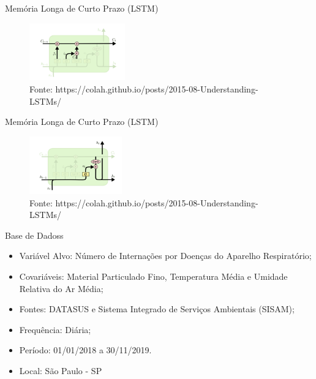\documentclass[
  ignorenonframetext,
]{beamer}
\providecommand{\tightlist}{%
  \setlength{\itemsep}{0pt}\setlength{\parskip}{0pt}}\usepackage{longtable,booktabs,array}
\begin{document}
\begin{frame}{Memória Longa de Curto Prazo (LSTM)}
\label{memuxf3ria-longa-de-curto-prazo-lstm-7}
\begin{figure}[H]

{\centering \includegraphics[width=1.62in,height=\textheight]{segunda_funcao_saida.png}

}

\caption{Fonte:
https://colah.github.io/posts/2015-08-Understanding-LSTMs/}

\end{figure}%
\end{frame}

\begin{frame}{Memória Longa de Curto Prazo (LSTM)}
\label{memuxf3ria-longa-de-curto-prazo-lstm-8}
\begin{figure}[H]

{\centering \includegraphics[width=1.57in,height=\textheight]{saida_final.png}

}

\caption{Fonte:
https://colah.github.io/posts/2015-08-Understanding-LSTMs/}

\end{figure}%
\end{frame}

\begin{frame}{Base de Dadoss}
\label{base-de-dadoss}
\begin{itemize}
\tightlist
\item
  Variável Alvo: Número de Internações por Doenças do Aparelho
  Respiratório;
\item
  Covariáveis: Material Particulado Fino, Temperatura Média e Umidade
  Relativa do Ar Média;
\item
  Fontes: DATASUS e Sistema Integrado de Serviços Ambientais (SISAM);
\item
  Frequência: Diária;
\item
  Período: 01/01/2018 a 30/11/2019.
\item
  Local: São Paulo - SP
\end{itemize}
\end{frame}
\end{document}
